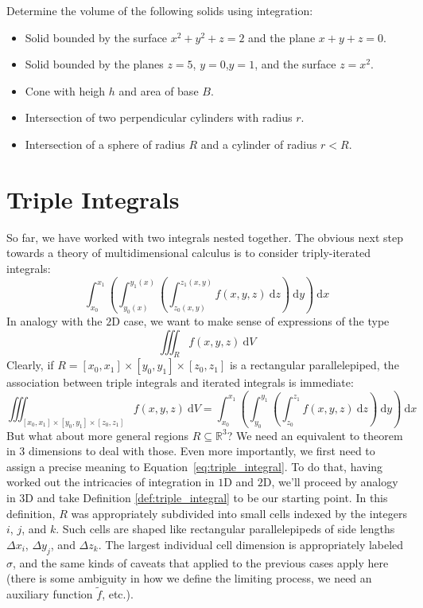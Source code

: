 \begin{exerciselist}
     \item Determine the volume of the following solids using integration:
     \begin{itemize}
        \item Solid bounded by the surface $x^2+y^2+z=2$ and the plane $x+y+z=0$.
        \item Solid bounded by the planes $z=5$, $y=0$,$y=1$, and the surface $z=x^2$.
        \item Cone with heigh $h$ and area of base $B$.
        \item Intersection of two perpendicular cylinders with radius $r$.
        \item Intersection of a sphere of radius $R$ and a cylinder of radius $r<R$.
     \end{itemize}
\end{exerciselist}

\section{Triple Integrals}

So far, we have worked with two integrals nested together. The obvious next step towards a theory of multidimensional calculus is to consider triply-iterated integrals:
\begin{equation*}
    \int_{x_0}^{x_1} \left( \int_{y_0(x)}^{y_1(x)} \left( \int_{z_0(x,y)}^{z_1(x,y)} f(x,y,z) \ \mathrm{d} z \right) \ \mathrm{d} y\right) \ \mathrm{d} x
\end{equation*}
In analogy with the $2\text{D}$ case, we want to make sense of expressions of the type
\begin{equation}
    \label{eq:triple_integral}
    \iiint_R f(x,y,z) \ \mathrm{d} V
\end{equation}
Clearly, if $R=[x_0,x_1] \times [y_0, y_1] \times [z_0, z_1]$ is a rectangular parallelepiped, the association between triple integrals and iterated integrals is immediate:
\begin{equation*}
    \iiint_{[x_0,x_1] \times [y_0, y_1] \times [z_0, z_1]} f(x,y,z) \ \mathrm{d} V  = \int_{x_0}^{x_1} \left( \int_{y_0}^{y_1} \left( \int_{z_0}^{z_1} f(x,y,z) \ \mathrm{d} z \right) \ \mathrm{d} y\right) \ \mathrm{d} x
\end{equation*}
But what about more general regions $R\subseteq \mathbb{R}^3$? We need an equivalent to  theorem in 3 dimensions to deal with those. Even more importantly, we first need to assign a precise meaning to Equation~\ref{eq:triple_integral}. To do that, having worked out the intricacies of integration in $1\text{D}$ and $2\text{D}$, we'll proceed by analogy in $3\text{D}$ and take Definition \ref{def:triple_integral} to be our starting point. In this definition, $R$ was appropriately subdivided into small cells indexed by the integers $i$, $j$, and $k$. Such cells are shaped like rectangular parallelepipeds of side lengths $\Delta x_i$, $\Delta y_j$, and $\Delta z_k$. The largest individual cell dimension is appropriately labeled $\sigma$, and the same kinds of caveats that applied to the previous cases apply here (there is some ambiguity in how we define the limiting process, we need an auxiliary function $\tilde{f}$, etc.).

